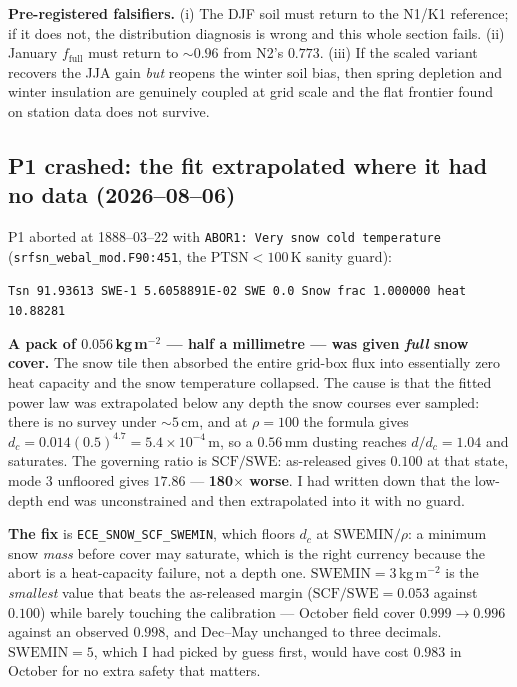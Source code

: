 \documentclass[10pt]{article}
\begin{document}
\textbf{Pre-registered falsifiers.} (i) The DJF soil must return to the N1/K1 reference; if it
does not, the distribution diagnosis is wrong and this whole section fails. (ii) January
$f_{\text{full}}$ must return to ${\sim}0.96$ from N2's $0.773$. (iii) If the scaled variant
recovers the JJA gain \emph{but} reopens the winter soil bias, then spring depletion and winter
insulation are genuinely coupled at grid scale and the flat frontier found on station data does
not survive.

\subsection{P1 crashed: the fit extrapolated where it had no data (2026--08--06)}\label{sub:r20crash}
P1 aborted at 1888--03--22 with \texttt{ABOR1: Very snow cold temperature}
(\texttt{srfsn\_webal\_mod.F90:451}, the $\mathrm{PTSN}<100$\,K sanity guard):
\begin{center}\footnotesize
\texttt{Tsn 91.93613 \quad SWE-1 5.6058891E-02 \quad SWE 0.0 \quad Snow frac 1.000000 \quad heat 10.88281}
\end{center}
\textbf{A pack of $0.056$\,kg\,m$^{-2}$ --- half a millimetre --- was given \emph{full} snow
cover.} The snow tile then absorbed the entire grid-box flux into essentially zero heat
capacity and the snow temperature collapsed. The cause is that the fitted power law was
extrapolated below any depth the snow courses ever sampled: there is no survey under
${\sim}5$\,cm, and at $\rho=100$ the formula gives $d_c = 0.014(0.5)^{4.7} = 5.4\times10^{-4}$\,m,
so a $0.56$\,mm dusting reaches $d/d_c = 1.04$ and saturates. The governing ratio is
$\mathrm{SCF}/\mathrm{SWE}$: as-released gives $0.100$ at that state, mode 3 unfloored gives
$17.86$ --- \textbf{180$\times$ worse}. I had written down that the low-depth end was
unconstrained and then extrapolated into it with no guard.

\textbf{The fix} is \texttt{ECE\_SNOW\_SCF\_SWEMIN}, which floors $d_c$ at
$\mathrm{SWEMIN}/\rho$: a minimum snow \emph{mass} before cover may saturate, which is the
right currency because the abort is a heat-capacity failure, not a depth one.
$\mathrm{SWEMIN}=3$\,kg\,m$^{-2}$ is the \emph{smallest} value that beats the as-released
margin ($\mathrm{SCF}/\mathrm{SWE}=0.053$ against $0.100$) while barely touching the
calibration --- October field cover $0.999\to0.996$ against an observed $0.998$, and Dec--May
unchanged to three decimals. $\mathrm{SWEMIN}=5$, which I had picked by guess first, would have
cost $0.983$ in October for no extra safety that matters.
\end{document}
